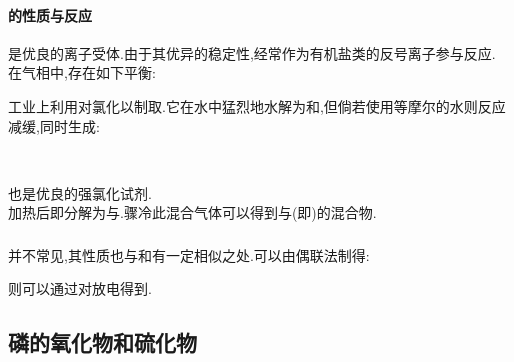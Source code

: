 \documentclass{ctexart}
\begin{document}
\paragraph{的性质与反应}
是优良的离子受体.\ce{[PF6]-}由于其优异的稳定性,经常作为有机盐类的反号离子参与反应.\\
\indent 在气相中,存在如下平衡:
\begin{center}
\end{center}
工业上利用对氯化以制取.它在水中猛烈地水解为和,但倘若使用等摩尔的水则反应减缓,同时生成:
\begin{center}
    \\
\end{center}
也是优良的强氯化试剂.\\
\indent {}加热后即分解为与.骤冷此混合气体可以得到与(即\ce{[PBr4]+[Br3]-})的混合物.
\subsubsection{}
并不常见,其性质也与和有一定相似之处.可以由偶联法制得:
\begin{center}
\end{center}
则可以通过对放电得到.
\subsection{磷的氧化物和硫化物}
\end{document}
